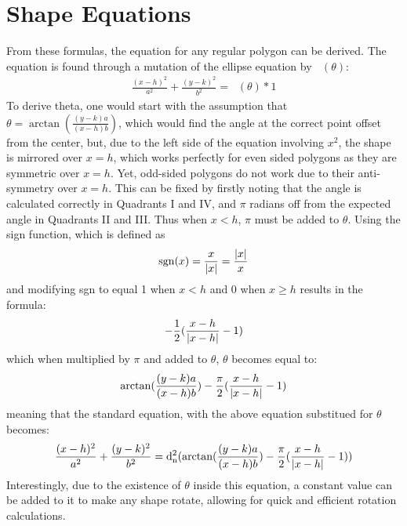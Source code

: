 \documentclass[11pt]{article}
\DeclareMathOperator{\custd}{\mathrm{d}_n}
\DeclareMathOperator{\custdsq}{\mathrm{d}^2_n}
\DeclarePairedDelimiter\abs{\lvert}{\rvert}%
\begin{document}
\section{Shape Equations}
From these formulas, the equation for any regular polygon can be derived. The equation is found through a mutation of the ellipse equation by \(\custd(\theta)\):
\begin{gather*}
\frac{(x-h)^2}{a^2}+\frac{(y-k)^2}{b^2}=\custdsq(\theta)*1
\end{gather*}
To derive theta, one would start with the assumption that \(\theta=\arctan(\frac{(y-k)a}{(x-h)b})\), which would find the angle at the correct point offset from the center, but, due to the left side of the equation involving \(x^2\), the shape is mirrored over \(x=h\), which works perfectly for even sided polygons as they are symmetric over \(x=h\). Yet, odd-sided polygons do not work due to their anti-symmetry over \(x=h\). This can be fixed by firstly noting that the angle is calculated correctly in Quadrants I and IV, and \(\pi\) radians off from the expected angle in Quadrants II and III. Thus when \(x<h\), \(\pi\) must be added to \(\theta\). Using the sign function, which is defined as
\begin{gather*}
\mathrm{sgn}(x)=\frac{x}{\abs{x}}=\frac{\abs{x}}{x}
\end{gather*}
and modifying sgn to equal 1 when \(x<h\) and 0 when \(x\geq h\) results in the formula:
\begin{gather*}
-\frac{1}{2}(\frac{x-h}{\abs{x-h}}-1)
\end{gather*}
which when multiplied by \(\pi\) and added to \(\theta\), \(\theta\) becomes equal to:
\begin{gather*}
\arctan(\frac{(y-k)a}{(x-h)b})-\frac{\pi}{2}(\frac{x-h}{\abs{x-h}}-1)
\end{gather*}
meaning that the standard equation, with the above equation substitued for \(\theta\) becomes:
\begin{gather*}
\frac{(x-h)^2}{a^2}+\frac{(y-k)^2}{b^2}=\custdsq(\arctan(\frac{(y-k)a}{(x-h)b})-\frac{\pi}{2}(\frac{x-h}{\abs{x-h}}-1))
\end{gather*}
Interestingly, due to the existence of \(\theta\) inside this equation, a constant value can be added to it to make any shape rotate, allowing for quick and efficient rotation calculations.
\end{document}
